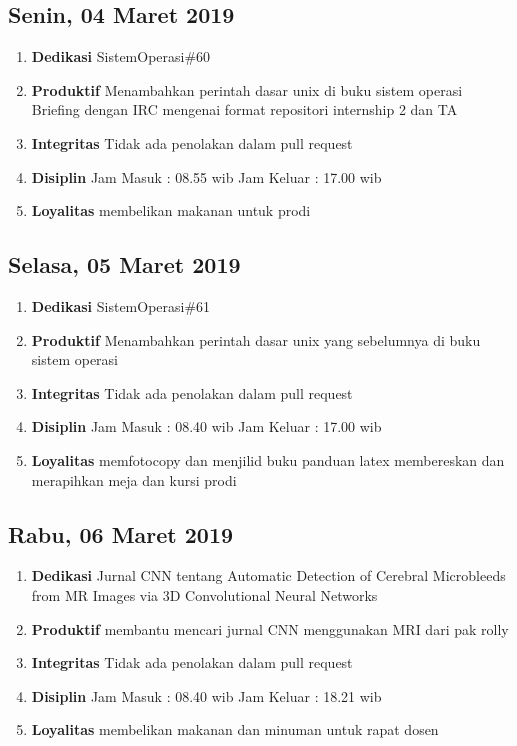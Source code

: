 \subsection{Senin, 04 Maret 2019}
\begin{enumerate}
\item \textbf{Dedikasi}
\subitem SistemOperasi\#60
\item \textbf{Produktif}
\subitem Menambahkan perintah dasar unix di buku sistem operasi
\subitem Briefing dengan IRC mengenai format repositori internship 2 dan TA
\item \textbf{Integritas}
\subitem Tidak ada penolakan dalam pull request
\item \textbf{Disiplin}
\subitem Jam Masuk : 08.55 wib
\subitem Jam Keluar : 17.00 wib
\item \textbf{Loyalitas}
\subitem membelikan makanan untuk prodi 
\end{enumerate}

\subsection{Selasa, 05 Maret 2019}
\begin{enumerate}
\item \textbf{Dedikasi}
\subitem SistemOperasi\#61
\item \textbf{Produktif}
\subitem Menambahkan perintah dasar unix yang sebelumnya di buku sistem operasi
\item \textbf{Integritas}
\subitem Tidak ada penolakan dalam pull request
\item \textbf{Disiplin}
\subitem Jam Masuk : 08.40 wib
\subitem Jam Keluar : 17.00 wib
\item \textbf{Loyalitas}
\subitem memfotocopy dan menjilid buku panduan latex
\subitem membereskan dan merapihkan meja dan kursi prodi
\end{enumerate}

\subsection{Rabu, 06 Maret 2019}
\begin{enumerate}
\item \textbf{Dedikasi}
\subitem Jurnal CNN tentang Automatic Detection of Cerebral Microbleeds from
MR Images via 3D Convolutional Neural Networks
\item \textbf{Produktif}
\subitem membantu mencari jurnal CNN menggunakan MRI dari pak rolly
\item \textbf{Integritas}
\subitem Tidak ada penolakan dalam pull request
\item \textbf{Disiplin}
\subitem Jam Masuk : 08.40 wib
\subitem Jam Keluar : 18.21 wib
\item \textbf{Loyalitas}
\subitem membelikan makanan dan minuman untuk rapat dosen
\end{enumerate}

